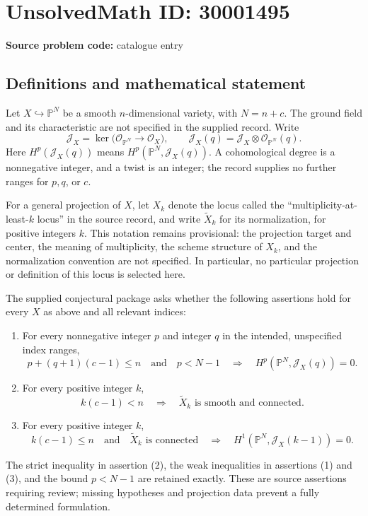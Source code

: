 \documentclass[11pt]{article}
\newcommand{\PP}{\mathbb{P}}
\begin{document}
\section*{UnsolvedMath ID: 30001495}
\textbf{Source problem code:} catalogue entry
\subsection{Definitions and mathematical statement}
Let \(X\hookrightarrow\PP^N\) be a smooth \(n\)-dimensional variety, with \(N=n+c\). The ground field and its characteristic are not specified in the supplied record. Write
\[
\mathcal J_X=\ker\bigl(\mathcal O_{\PP^N}\longrightarrow\mathcal O_X\bigr),\qquad
\mathcal J_X(q)=\mathcal J_X\otimes\mathcal O_{\PP^N}(q).
\]
Here \(H^p(\mathcal J_X(q))\) means \(H^p(\PP^N,\mathcal J_X(q))\). A cohomological degree is a nonnegative integer, and a twist is an integer; the record supplies no further ranges for \(p,q\), or \(c\).

For a general projection of \(X\), let \(X_k\) denote the locus called the ``multiplicity-at-least-\(k\) locus'' in the source record, and write \(\widetilde X_k\) for its normalization, for positive integers \(k\). This notation remains provisional: the projection target and center, the meaning of multiplicity, the scheme structure of \(X_k\), and the normalization convention are not specified. In particular, no particular projection or definition of this locus is selected here.

The supplied conjectural package asks whether the following assertions hold for every \(X\) as above and all relevant indices:
\begin{enumerate}
\item For every nonnegative integer \(p\) and integer \(q\) in the intended, unspecified index ranges,
\[
p+(q+1)(c-1)\leq n\quad\text{and}\quad p<N-1
\quad\Longrightarrow\quad
H^p(\PP^N,\mathcal J_X(q))=0.
\]
\item For every positive integer \(k\),
\[
k(c-1)<n
\quad\Longrightarrow\quad
\widetilde X_k\text{ is smooth and connected}.
\]
\item For every positive integer \(k\),
\[
k(c-1)\leq n\quad\text{and}\quad\widetilde X_k\text{ is connected}
\quad\Longrightarrow\quad
H^1(\PP^N,\mathcal J_X(k-1))=0.
\]
\end{enumerate}
The strict inequality in assertion (2), the weak inequalities in assertions (1) and (3), and the bound \(p<N-1\) are retained exactly. These are source assertions requiring review; missing hypotheses and projection data prevent a fully determined formulation.
\end{document}

